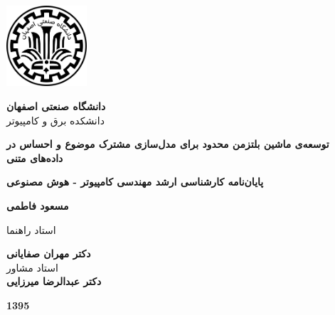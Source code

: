 \thispagestyle{empty}
\begin{center}
\includegraphics[height=3cm]{firstpage-img/iut_logo_fa}

{\large
	\textbf{دانشگاه صنعتی اصفهان}\\
	دانشکده  برق و کامپیوتر
}
\vspace{3.5cm}

{\LARGE
	\textbf{توسعه‌ی ماشین بلتزمن محدود برای مدل‌سازی مشترک موضوع و احساس در داده‌های متنی}\\
}
\vspace{3.5cm}

{\large
	\textbf{پایان‌نامه کارشناسی ارشد مهندسی کامپیوتر - هوش مصنوعی}\\
}
\vspace{1cm}

{\Large
	\textbf{مسعود فاطمی}\\
}
\vspace{2.5cm}

{\large
	استاد راهنما\\
}
\vspace{0.5cm}

{\Large
	\textbf{دکتر مهران صفایانی}\\
}
\vspace{1cm}
{\large
	استاد مشاور\\
}
\vspace{0.5cm}
{\Large
	\textbf{دکتر عبدالرضا میرزایی}\\
}
\vspace{2cm}

{\Large
	\textbf{1395}
}

\end{center}
\restoregeometry
\pagebreak

